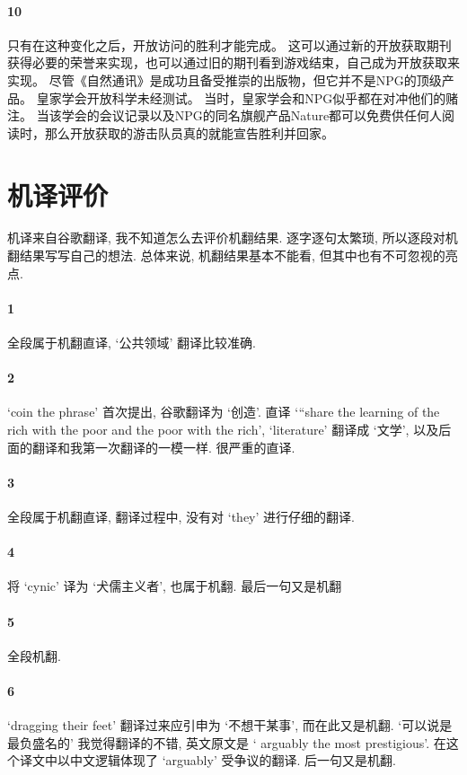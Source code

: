 \documentclass[a4paper, 12pt, UTF8]{article}
\begin{document}
\paragraph{10}只有在这种变化之后，开放访问的胜利才能完成。 这可以通过新的开放获取期刊获得必要的荣誉来实现，也可以通过旧的期刊看到游戏结束，自己成为开放获取来实现。 尽管《自然通讯》是成功且备受推崇的出版物，但它并不是NPG的顶级产品。 皇家学会开放科学未经测试。 当时，皇家学会和NPG似乎都在对冲他们的赌注。 当该学会的会议记录以及NPG的同名旗舰产品Nature都可以免费供任何人阅读时，那么开放获取的游击队员真的就能宣告胜利并回家。

\section{机译评价}
机译来自谷歌翻译, 我不知道怎么去评价机翻结果. 逐字逐句太繁琐, 所以逐段对机翻结果写写自己的想法. 总体来说, 机翻结果基本不能看, 但其中也有不可忽视的亮点.

\paragraph{1} 全段属于机翻直译, `公共领域' 翻译比较准确.

\paragraph{2} `coin the phrase' 首次提出, 谷歌翻译为 `创造'. 直译 `“share the learning of the rich with the poor and the poor with the rich', `literature' 翻译成 `文学', 以及后面的翻译和我第一次翻译的一模一样. 很严重的直译.

\paragraph{3} 全段属于机翻直译, 翻译过程中, 没有对 `they' 进行仔细的翻译.

\paragraph{4} 将 `cynic' 译为 `犬儒主义者', 也属于机翻. 最后一句又是机翻

\paragraph{5} 全段机翻.

\paragraph{6} `dragging their feet' 翻译过来应引申为 `不想干某事', 而在此又是机翻. `可以说是最负盛名的' 我觉得翻译的不错, 英文原文是 ` arguably the most prestigious'. 在这个译文中以中文逻辑体现了 `arguably' 受争议的翻译. 后一句又是机翻.
\end{document}
